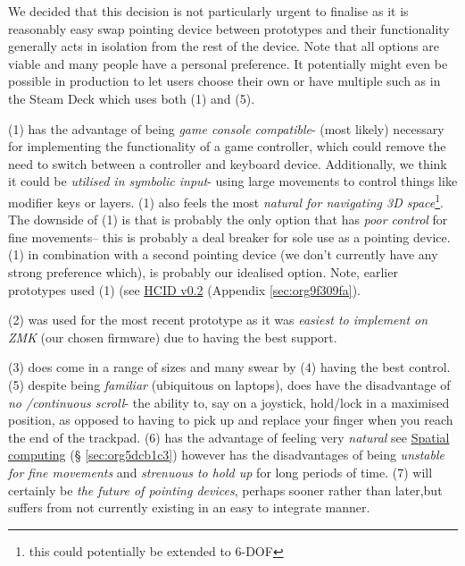 \documentclass[logo,bsc,singlespacing,parskip]{infthesis}
\begin{document}
We decided that this decision is not particularly urgent to finalise as it is reasonably easy swap pointing device between prototypes and their functionality generally acts in isolation from the rest of the device.
Note that all options are viable and many people have a personal preference.
It potentially might even be possible in production to let users choose their own or have multiple such as in the Steam Deck \autocite{SteamDeck2022}  which uses both (1) and (5).

(1) has the advantage of being \emph{game console compatible}- (most likely) necessary for implementing the functionality of a game controller, which could remove the need to switch between a controller and keyboard device.
Additionally, we think it could be \emph{utilised in symbolic input}- using large movements to control things like modifier keys or layers.
(1) also feels the most \emph{natural for navigating 3D space}\footnote{this could potentially be extended to 6-DOF}.
The downside of (1) is that is probably the only option that has \emph{poor control} for fine movements-- this is probably a deal breaker for sole use as a pointing device.
(1) in combination with a second pointing device (we don't currently have any strong preference which), is probably our idealised option.
Note, earlier prototypes used (1) (see \hyperref[sec:org9f309fa]{HCID v0.2} (Appendix \ref{sec:org9f309fa}).

(2) was used for the most recent prototype as it was \emph{easiest to implement on ZMK} (our chosen firmware) due to having the best support.

(3) does come in a range of sizes and many swear by (4) having the best control.
(5) despite being \emph{familiar} (ubiquitous on laptops), does have the disadvantage of \emph{no /continuous scroll}- the ability to, say on a joystick, hold/lock in a maximised position, as opposed to having to pick up and replace your finger when you reach the end of the trackpad.
(6) has the advantage of feeling very \emph{natural} see \hyperref[sec:org5dcb1c3]{Spatial computing} (§ \ref{sec:org5dcb1c3}) however has the disadvantages of being \emph{unstable for fine movements} and \emph{strenuous to hold up} for long periods of time.
(7) will certainly be \emph{the future of pointing devices}, perhaps sooner rather than later,but suffers from not currently existing in an easy to integrate manner.
\end{document}

